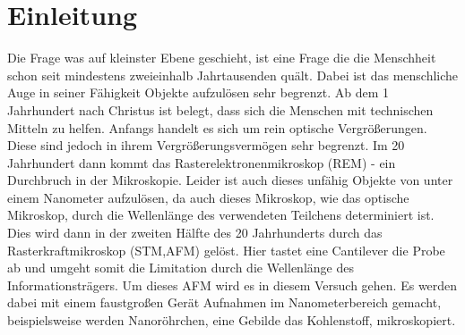 

\chapter{Einleitung}
\label{chap:einleitung}

Die Frage was auf kleinster Ebene geschieht, ist eine Frage die die Menschheit schon seit mindestens zweieinhalb Jahrtausenden 
quält. Dabei ist das menschliche Auge in seiner Fähigkeit Objekte aufzulösen sehr begrenzt. Ab dem 1 Jahrhundert nach Christus ist belegt, 
dass sich die Menschen mit technischen Mitteln zu helfen. Anfangs handelt es sich um rein optische Vergrößerungen. Diese sind jedoch in ihrem Vergrößerungsvermögen sehr 
begrenzt. Im 20 Jahrhundert dann kommt das Rasterelektronenmikroskop (REM) - ein Durchbruch in der Mikroskopie. Leider ist auch dieses unfähig Objekte von unter einem Nanometer 
aufzulösen, da auch dieses Mikroskop, wie das optische Mikroskop, durch die Wellenlänge des verwendeten Teilchens determiniert ist. Dies wird dann in der zweiten Hälfte des 20 
Jahrhunderts durch das Rasterkraftmikroskop (STM,AFM) gelöst. Hier tastet eine Cantilever die Probe ab und umgeht somit die Limitation durch die Wellenlänge des Informationsträgers. 
Um dieses AFM wird es in diesem Versuch gehen. Es werden dabei mit einem faustgroßen Gerät Aufnahmen im Nanometerbereich gemacht, beispielsweise werden Nanoröhrchen, eine 
Gebilde das Kohlenstoff, mikroskopiert. 